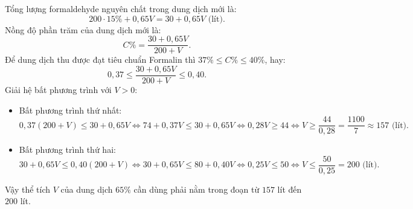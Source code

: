\begin{bt}
{\begin{enumerate}[a)]
	Tổng lượng formaldehyde nguyên chất trong dung dịch mới là:
	$$ 200 \cdot 15\% + 0{,}65V = 30 + 0{,}65V\text{ (lít)}. $$
	Nồng độ phần trăm của dung dịch mới là:
	$$ C\% = \dfrac{30 + 0{,}65V}{200 + V}. $$
	Để dung dịch thu được đạt tiêu chuẩn Formalin thì $37\% \le C\% \le 40\%$, hay:
	$$ 0{,}37 \le \dfrac{30 + 0{,}65V}{200 + V} \le 0{,}40. $$
	Giải hệ bất phương trình với $V > 0$:
	\begin{itemize}
		\item Bất phương trình thứ nhất:
		$$ 0{,}37(200 + V) \le 30 + 0{,}65V \iff 74 + 0{,}37V \le 30 + 0{,}65V \iff 0{,}28V \ge 44 \iff V \ge \dfrac{44}{0{,}28} = \dfrac{1100}{7} \approx 157\text{ (lít)}. $$
		\item Bất phương trình thứ hai:
		$$ 30 + 0{,}65V \le 0{,}40(200 + V) \iff 30 + 0{,}65V \le 80 + 0{,}40V \iff 0{,}25V \le 50 \iff V \le \dfrac{50}{0{,}25} = 200\text{ (lít)}. $$
	\end{itemize}
	Vậy thể tích $V$ của dung dịch $65\%$ cần dùng phải nằm trong đoạn từ $157$ lít đến $200$ lít.
\end{enumerate}
}
\end{bt}

